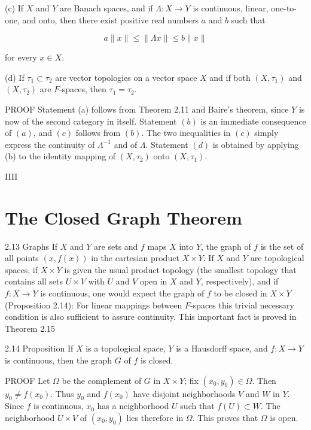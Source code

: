 \documentclass[10pt]{article}
\begin{document}
(c) If $X$ and $Y$ are Banach spaces, and if $\Lambda: X \rightarrow Y$ is continuous, linear, one-to-one, and onto, then there exist positive real numbers $a$ and $b$ such that

$$
a\|x\| \leq\|\Lambda x\| \leq b\|x\|
$$

for every $x \in X$.

(d) If $\tau_{1} \subset \tau_{2}$ are vector topologies on a vector space $X$ and if both $\left(X, \tau_{1}\right)$ and $\left(X, \tau_{2}\right)$
are $F$-spaces, then $\tau_{1}=\tau_{2}$.

PROOF Statement (a) follows from Theorem 2.11 and Baire's theorem, since $Y$ is now of the second category in itself. Statement $(b)$ is an immediate consequence of $(a)$, and $(c)$ follows from $(b)$. The two inequalities in $(c)$ simply express the continuity of $\Lambda^{-1}$ and of $\Lambda$. Statement $(d)$ is obtained by applying (b) to the identity mapping of $\left(X, \tau_{2}\right)$ onto $\left(X, \tau_{1}\right)$.

IIII

\section{The Closed Graph Theorem}
2.13 Graphs If $X$ and $Y$ are sets and $f$ maps $X$ into $Y$, the graph of $f$ is the set of all points $(x, f(x))$ in the cartesian product $X \times Y$. If $X$ and $Y$ are topological spaces, if $X \times \dot{Y}$ is given the usual product topology (the smallest topology that contains all sets $U \times V$ with $U$ and $V$ open in $X$ and $Y$, respectively), and if $f: X \rightarrow Y$ is continuous, one would expect the graph of $f$ to be closed in $X \times Y$ (Proposition 2.14): For linear mappings between $F$-spaces this trivial necessary condition is also sufficient to assure continuity. This important fact is proved in Theorem 2.15

2.14 Proposition If $X$ is a topological space, $Y$ is a Hausdorff space, and $f: X \rightarrow Y$ is continuous, then the graph $G$ of $f$ is closed.

PROOF Let $\Omega$ be the complement of $G$ in $X \times Y$; fix $\left(x_{0}, y_{0}\right) \in \Omega$. Then $y_{0} \neq f\left(x_{0}\right)$. Thus $y_{0}$ and $f\left(x_{0}\right)$ have disjoint neighborhoods $V$ and $W$ in $Y$. Since $f$ is continuous, $x_{0}$ has a neighborhood $U$ such that $f(U) \subset W$. The neighborhood $U \times V$ of $\left(x_{0}, y_{0}\right)$ lies therefore in $\Omega$. This proves that $\Omega$ is open.
\end{document}
